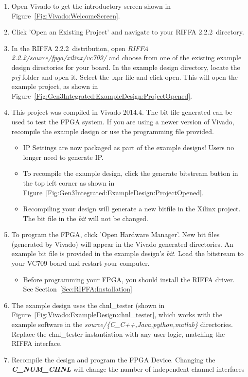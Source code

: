\documentclass{refrep}
\newcommand{\VivadoVer}{2014.4}
\newcommand{\RIFFAVer}{2.2.2}
\newcommand{\Directory}[1]{\textit{#1}}
\newcommand{\RIFFAParameter}[1]{\textit{\textbf{#1}}}
\begin{document}
\begin{enumerate}
\item Open Vivado to get the introductory screen shown in
  Figure~\ref{Fig:Vivado:WelcomeScreen}.
\item Click 'Open an Existing Project' and navigate to your RIFFA
  \RIFFAVer~directory.
\item In the RIFFA \RIFFAVer~distribution, open \Directory{RIFFA
  \RIFFAVer/source/fpga/xilinx/vc709/} and choose from one of the existing
  example design directories for your board. In the example design directory,
  locate the \Directory{prj} folder and open it. Select the .xpr file and click
  open. This will open the example project, as shown in
  Figure~\ref{Fig:Gen3Integrated:ExampleDesign:ProjectOpened}.
\item This project was compiled in Vivado \VivadoVer. The bit file generated can
  be used to test the FPGA system. If you are using a newer version of Vivado,
  recompile the example design or use the programming file provided.
  \begin{itemize}
  \item IP Settings are now packaged as part of the example designs! Users no
    longer need to generate IP.
  \item To recompile the example design, click the generate bitstream button in
    the top left corner as shown in
    Figure~\ref{Fig:Gen3Integrated:ExampleDesign:ProjectOpened}.
  \item Recompiling your design will generate a new bitfile in the Xilinx
    project. The bit file in the \Directory{bit} will not be changed.
  \end{itemize}
\item To program the FPGA, click 'Open Hardware Manager'. New bit files
  (generated by Vivado) will appear in the Vivado generated directories. An
  example bit file is provided in the example design's \Directory{bit}. Load the
  bitstream to your VC709 board and restart your computer.
  \begin{itemize}
  \item Before programming your FPGA, you should install the RIFFA driver. See
    Section~\ref{Sec:RIFFA:Installation}
  \end{itemize}
\item The example design uses the chnl\_tester (shown in
  Figure~\ref{Fig:Vivado:ExampleDesign:chnl_tester}, which works with
  the example software in the \Directory{source/\{C\_C++,Java,python,matlab\}}
  directories. Replace the chnl\_tester instantiation with any user logic,
  matching the RIFFA interface.
\item Recompile the design and program the FPGA Device. Changing the
  \RIFFAParameter{C\_NUM\_CHNL} will change the number of independent channel
  interfaces
\end{enumerate}
\end{document}
